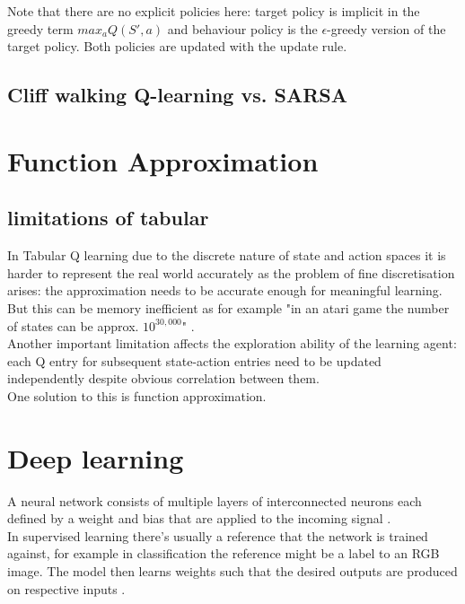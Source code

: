 Note that there are no explicit policies here: target policy is implicit in the greedy term $max_a Q(S', a)$ and behaviour policy is the $\epsilon$-greedy version of the target policy. Both policies are updated with the update rule.

\subsection{Cliff walking  Q-learning vs. SARSA}

\section{Function Approximation}

\subsection{limitations of tabular}

In Tabular Q learning due to the discrete nature of 
state and action spaces it is harder to represent the real world accurately as the problem of fine discretisation arises: the approximation needs to be accurate enough for meaningful learning. But this can be memory inefficient as for example "in an atari game the number of states can be  approx. $10^{30,000}$" \cite{lecture_intro_to_deep_rl}. \\

Another important limitation affects the exploration ability of the learning agent: each Q entry for subsequent state-action entries need to be updated independently despite obvious correlation between them.\\

One solution to this is function approximation.

\section{Deep learning}

A neural network consists of multiple layers of interconnected neurons each defined by a weight and bias that are applied to the incoming signal \cite{lecture_intro_to_deep_rl}.\\

In supervised learning there's usually a reference that 
the network is trained against, for example in classification the reference might be a label to an RGB image. The model then learns weights such that the desired outputs are produced on respective inputs \cite{lecture_intro_to_deep_rl} . \\

